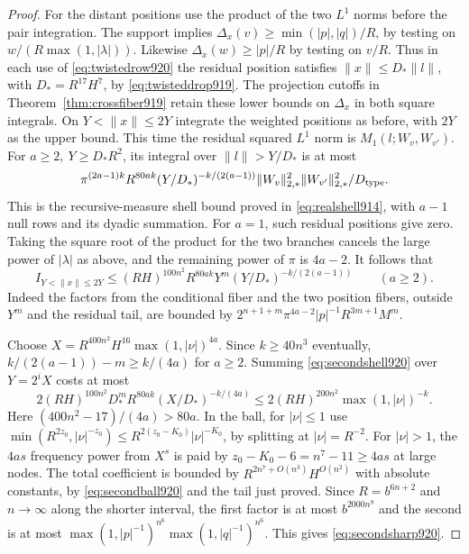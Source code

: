 \documentclass[a4paper,11pt]{article}
\theoremstyle{definition}
\theoremstyle{remark}
\numberwithin{equation}{section}
\begin{document}
\begin{proof}
For the distant positions use the product of the two \(L^1\)
norms before the pair integration. The support implies
\(\Delta_x(v)\ge\min(|p|,|q|)/R\), by testing on
\(w/(R\max(1,|\lambda|))\). Likewise
\(\Delta_x(w)\ge |p|/R\) by testing on \(v/R\).
Thus in each use of \eqref{eq:twistedrow920} the residual
position satisfies \(\|x\|\le D_*\|l\|\), with
\(D_*=R^{17}H^7\), by \eqref{eq:twisteddrop919}. The
projection cutoffs in Theorem~\ref{thm:crossfiber919} retain
these lower bounds on \(\Delta_x\) in both square integrals.
On \(Y<\|x\|\le2Y\) integrate the weighted positions as
before, with \(2Y\) as the upper bound. This time the
residual squared \(L^1\) norm is \(M_1(l;W_v,W_{v'})\).
For \(a\ge2,\ Y\ge D_*R^2\), its integral over \(\|l\|>Y/D_*\)
is at most
\[
 \pi^{(2a-1)k} R^{80ak}
    (Y/D_*)^{-k/(2(a-1))}
   \|W_v\|_{2,*}^2\|W_{v'}\|_{2,*}^2/D_{\rm type}.
\]
This is the recursive-measure shell bound proved in
\eqref{eq:realshell914}, with \(a-1\) null rows and its
dyadic summation. For \(a=1\), such residual positions give
zero. Taking the square root of the product for the two
branches cancels the large power of \(|\lambda|\) as above,
and the remaining power of \(\pi\) is \(4a-2\). It follows that
\begin{equation}
 I_{Y<\|x\|\le2Y}\le (RH)^{100n^2}
     R^{80ak} Y^m (Y/D_*)^{-k/(2(a-1))}
                     \qquad (a\ge2).
 \label{eq:secondshell920}
\end{equation}
Indeed the factors from the conditional fiber and the two
position fibers, outside \(Y^m\) and the residual tail, are
bounded by \(2^{n+1+m}\pi^{4a-2}|p|^{-1}R^{3m+1}M^m\).

Choose \(X=R^{400n^2}H^{16}\max(1,|\nu|)^{4a}\).
Since \(k\ge40n^3\) eventually,
\(k/(2(a-1))-m\ge k/(4a)\) for \(a\ge2\). Summing
\eqref{eq:secondshell920} over \(Y=2^iX\) costs at most
\[
   2(RH)^{100n^2} D_*^m R^{80ak}
                  (X/D_*)^{-k/(4a)}
       \le 2(RH)^{200n^2}\max(1,|\nu|)^{-k}.
\]
Here \((400n^2-17)/(4a)>80a\).
In the ball, for \(|\nu|\le1\) use
\(\min(R^{2z_0},|\nu|^{-z_0})\le
 R^{2(z_0-K_0)}|\nu|^{-K_0}\), by splitting at
\(|\nu|=R^{-2}\). For \(|\nu|>1\), the \(4as\) frequency
power from \(X^s\) is paid by
\(z_0-K_0-6=n^7-11\ge4as\) at large nodes.
The total coefficient is bounded by
\(R^{2n^7+O(n^3)}H^{O(n^2)}\) with absolute constants,
by \eqref{eq:secondball920} and the tail just proved.
Since \(R=b^{6n+2}\) and \(n\to\infty\) along the shorter
interval, the first factor is at most \(b^{2000n^9}\) and
the second is at most
\(\max(1,|p|^{-1})^{n^6}\max(1,|q|^{-1})^{n^6}\).
This gives \eqref{eq:secondsharp920}.
\end{proof}
\clearpage
\end{document}
